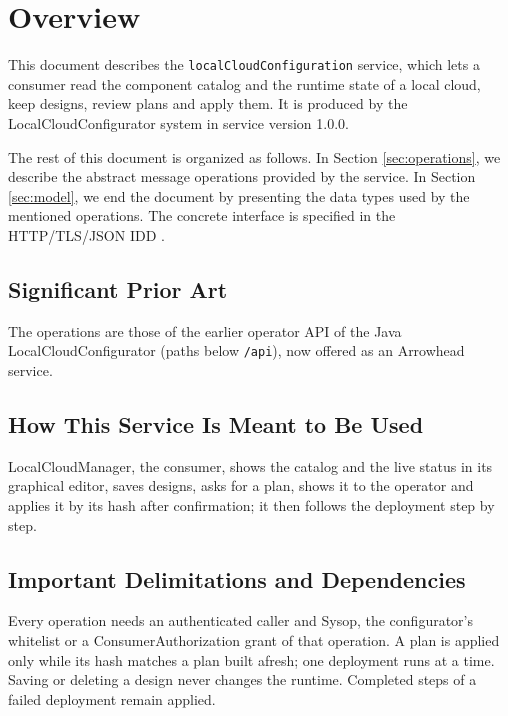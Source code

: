 \documentclass[a4paper]{arrowhead}
\begin{document}
\section{Overview}
\label{sec:overview}

This document describes the \texttt{local\allowbreak{}Cloud\allowbreak{}Configuration} service, which lets a consumer read the component catalog and the runtime state of a local cloud, keep designs, review plans and apply them. It is produced by the LocalCloudConfigurator system \cite{lcc-sysd} in service version 1.0.0.

The rest of this document is organized as follows.
In Section \ref{sec:operations}, we describe the abstract message operations provided by the service.
In Section \ref{sec:model}, we end the document by presenting the data types used by the mentioned operations.
The concrete interface is specified in the HTTP/TLS/JSON IDD \cite{lcc-localCloudConfiguration-http-idd}.

\subsection{Significant Prior Art}

The operations are those of the earlier operator API of the Java LocalCloudConfigurator (paths below \texttt{/api}), now offered as an Arrowhead service.

\subsection{How This Service Is Meant to Be Used}

LocalCloudManager, the consumer, shows the catalog and the live status in its graphical editor, saves designs, asks for a plan, shows it to the operator and applies it by its hash after confirmation; it then follows the deployment step by step.

\subsection{Important Delimitations and Dependencies}
\label{sec:delimitations}

Every operation needs an authenticated caller and Sysop, the configurator's whitelist or a ConsumerAuthorization grant of that operation. A plan is applied only while its hash matches a plan built afresh; one deployment runs at a time. Saving or deleting a design never changes the runtime. Completed steps of a failed deployment remain applied.
\end{document}
